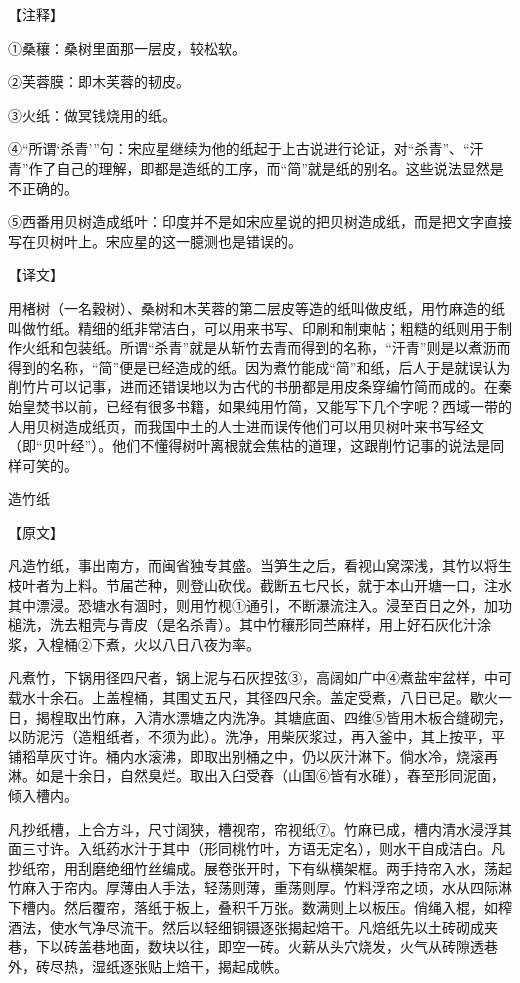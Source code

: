 \documentclass[12pt,UTF8]{ctexbook}
\begin{document}
【注释】

①桑穰：桑树里面那一层皮，较松软。

②芙蓉膜：即木芙蓉的韧皮。

③火纸：做冥钱烧用的纸。

④“所谓‘杀青’”句：宋应星继续为他的纸起于上古说进行论证，对“杀青”、“汗青”作了自己的理解，即都是造纸的工序，而“简”就是纸的别名。这些说法显然是不正确的。

⑤西番用贝树造成纸叶：印度并不是如宋应星说的把贝树造成纸，而是把文字直接写在贝树叶上。宋应星的这一臆测也是错误的。

【译文】

用楮树（一名穀树）、桑树和木芙蓉的第二层皮等造的纸叫做皮纸，用竹麻造的纸叫做竹纸。精细的纸非常洁白，可以用来书写、印刷和制柬帖；粗糙的纸则用于制作火纸和包装纸。所谓“杀青”就是从斩竹去青而得到的名称，“汗青”则是以煮沥而得到的名称，“简”便是已经造成的纸。因为煮竹能成“简”和纸，后人于是就误认为削竹片可以记事，进而还错误地以为古代的书册都是用皮条穿编竹简而成的。在秦始皇焚书以前，已经有很多书籍，如果纯用竹简，又能写下几个字呢？西域一带的人用贝树造成纸页，而我国中土的人士进而误传他们可以用贝树叶来书写经文（即“贝叶经”）。他们不懂得树叶离根就会焦枯的道理，这跟削竹记事的说法是同样可笑的。

造竹纸

【原文】

凡造竹纸，事出南方，而闽省独专其盛。当笋生之后，看视山窝深浅，其竹以将生枝叶者为上料。节届芒种，则登山砍伐。截断五七尺长，就于本山开塘一口，注水其中漂浸。恐塘水有涸时，则用竹枧①通引，不断瀑流注入。浸至百日之外，加功槌洗，洗去粗壳与青皮（是名杀青）。其中竹穰形同苎麻样，用上好石灰化汁涂浆，入楻桶②下煮，火以八日八夜为率。

凡煮竹，下锅用径四尺者，锅上泥与石灰捏弦③，高阔如广中④煮盐牢盆样，中可载水十余石。上盖楻桶，其围丈五尺，其径四尺余。盖定受煮，八日已足。歇火一日，揭楻取出竹麻，入清水漂塘之内洗净。其塘底面、四维⑤皆用木板合缝砌完，以防泥污（造粗纸者，不须为此）。洗净，用柴灰浆过，再入釜中，其上按平，平铺稻草灰寸许。桶内水滚沸，即取出别桶之中，仍以灰汁淋下。倘水冷，烧滚再淋。如是十余日，自然臭烂。取出入臼受舂（山国⑥皆有水碓），舂至形同泥面，倾入槽内。

凡抄纸槽，上合方斗，尺寸阔狭，槽视帘，帘视纸⑦。竹麻已成，槽内清水浸浮其面三寸许。入纸药水汁于其中（形同桃竹叶，方语无定名），则水干自成洁白。凡抄纸帘，用刮磨绝细竹丝编成。展卷张开时，下有纵横架框。两手持帘入水，荡起竹麻入于帘内。厚薄由人手法，轻荡则薄，重荡则厚。竹料浮帘之顷，水从四际淋下槽内。然后覆帘，落纸于板上，叠积千万张。数满则上以板压。俏绳入棍，如榨酒法，使水气净尽流干。然后以轻细铜镊逐张揭起焙干。凡焙纸先以土砖砌成夹巷，下以砖盖巷地面，数块以往，即空一砖。火薪从头穴烧发，火气从砖隙透巷外，砖尽热，湿纸逐张贴上焙干，揭起成帙。
\end{document}
